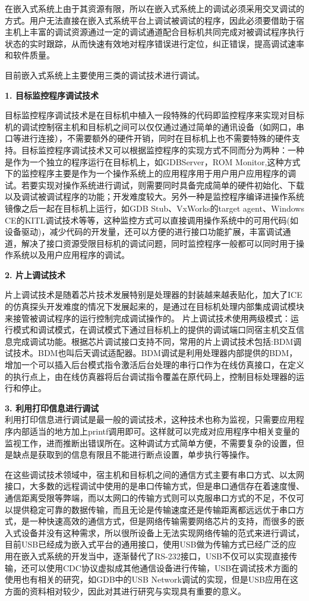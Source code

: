 	在嵌入式系统上由于其资源有限，所以在嵌入式系统上的调试必须采用交叉调试的方式。用户无法直接在嵌入式系统平台上调试被调试的程序，因此必须要借助于宿主机上丰富的调试资源通过一定的调试通道配合目标机共同完成对被调试程序执行状态的实时跟踪，从而快速有效地对程序错误进行定位，纠正错误，提高调试速率和软件质量。
	
	目前嵌入式系统上主要使用三类的调试技术进行调试。

	
	\textbf{1. 目标监控程序调试技术}
	
	目标监控程序调试技术是在目标机中植入一段特殊的代码即监控程序来实现对目标机的调试控制宿主机和目标机之间可以仅仅通过通过简单的通讯设备（如网口，串口等进行连接），不需要额外的硬件开销，同时在目标机上也不需要特殊的硬件支持。目标监控程序调试技术又可以根据监控程序的实现方式不同而分为两种：一种是作为一个独立的程序运行在目标机上，如GDBServer，ROM Monitor,这种方式下的监控程序主要是作为一个操作系统上的应用程序用于用户用户应用程序的调试。若要实现对操作系统进行调试，则需要同时具备完成简单的硬件初始化、下载以及调试被调试程序的功能；开发难度较大。另外一种是监控程序编译进操作系统镜像之后一起在目标机上运行，如GDB Stub、VxWorks的target agent、Windows CE的KITL调试技术等等，这种监控方式可以直接调用操作系统中的可用代码(如设备驱动)，减少代码的开发量，还可以方便的进行接口功能扩展，丰富调试通道，解决了接口资源受限目标机的调试问题，同时监控程序一般都可以同时用于操作系统以及用户应用程序的调试。
	
	\textbf{2. 片上调试技术}
	
	片上调试技术是随着芯片技术发展特别是处理器的封装越来越表贴化，加大了ICE的仿真探头开发难度的情况下发展起来的，是通过在目标机处理内部集成调试模块来接管被调试程序的运行控制完成调试操作的。
	片上调试技术使用两级模式：运行模式和调试模式，在调试模式下通过目标机上的提供的调试端口同宿主机交互信息完成调试功能。根据芯片调试接口支持不同，常用的片上调试技术包括:BDM调试技术。BDM也叫后天调试适配器。BDM调试是利用处理器内部提供的BDM，增加一个可以插入后台模式指令激活后台处理的串行口作为在线仿真接口，在定义的执行点上，由在线仿真器将后台调试指令覆盖在原代码上，控制目标处理器的运行和停止。
	
	
	\textbf{3. 利用打印信息进行调试}\\
	利用打印信息进行调试是最一般的调试技术，这种技术也称为监视，只需要应用程序内部适当的地方加上printf调用即可。这样就可以完成对应用程序中相关变量的监视工作，进而推断出错误所在。这种调试方式简单方便，不需要复杂的设置，但是缺点是获取到的信息有限且不能进行断点设置，单步执行等操作。
		
	
	
	在这些调试技术领域中，宿主机和目标机之间的通信方式主要有串口方式、以太网接口，大多数的远程调试中使用的是串口传输方式，但是串口通信存在着速度慢、通信距离受限等弊端，而以太网口的传输方式则可以克服串口方式的不足，不仅可以提供稳定可靠的数据传输，而且无论是传输速度还是传输距离都远远优于串口方式，是一种快速高效的通信方式，但是网络传输需要网络芯片的支持，而很多的嵌入式设备并没有这种需求，所以很所设备上无法实现网络传输的范式来进行调试，目前USB已经成为嵌入式平台的通用接口，使用USB做为传输方式已经广泛的应用在嵌入式系统的开发当中，逐渐替代了RS-232接口，USB不仅可以实现直接传输，还可以使用CDC协议虚拟成其他通信设备进行传输，USB在调试技术方面的使用也有相关的研究，如GDB中的USB Network调试的实现，但是USB应用在这方面的资料相对较少，因此对其进行研究与实现具有重要的意义。

